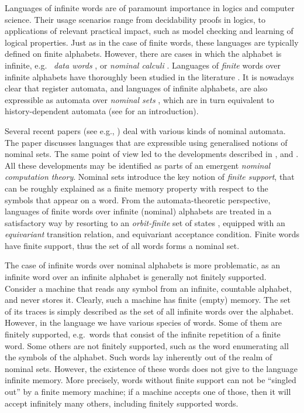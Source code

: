 

Languages of infinite words are of paramount importance in logics and computer science. Their usage scenarios range from decidability proofs in logics, 
 to applications of relevant practical impact, such as model checking and learning of logical properties. Just as in the case of finite words, these languages are typically defined on finite alphabets. However, there are cases in which the alphabet is infinite, e.g.\
\emph{data words} \cite{TODO}, or \emph{nominal calculi} \cite{Pi-calculus}. Languages of \emph{finite} words over infinite alphabets have thoroughly been studied in the literature \cite{KAMINKSIFRANCEZ,SEGOUFIN?,NIKOS}. 
It is nowadays clear that register automata, and languages of infinite alphabets, are also expressible as automata over \emph{nominal sets} \cite{GabbayPitts}, which are in turn equivalent  to history-dependent automata \cite{PISTORE,GADDUCCI,STATON,CIANCIA} (see \cite{CianciaTuostoTR} for an introduction). 
\todo{Si può citare qualcosa di Daniela?}

Several recent papers (see e.g., \cite{TOMOYUKI,GABBAYCIANCIA}) deal with various kinds of nominal automata. The paper \cite{MikLICS} discusses languages that are expressible using generalised notions of nominal sets. The same point of view led to the developments described in \cite{MikPOPL12}, and \cite{PittsPOPL13}. All these developments may be identified as parts of an emergent
\emph{nominal computation theory}. Nominal sets introduce the key notion of \emph{finite support}, that can be roughly explained as a finite memory property with respect to the symbols that appear on a word. From the automata-theoretic perspective, languages of finite words over infinite (nominal) alphabets are treated in a satisfactory way by resorting to an \emph{orbit-finite} set of states \cite{CianciaMontanariIC?}, equipped with an \emph{equivariant} transition relation, and equivariant acceptance condition. Finite words have finite support, thus the set of all words forms a nominal set. 

The case of infinite words over nominal alphabets is more problematic, as an infinite word over an infinite alphabet is generally not finitely supported. Consider a machine that reads any symbol from an infinite, countable alphabet, and never stores it. Clearly, such a machine has finite (empty) memory. The set of its traces is simply described as the set of all infinite words over the alphabet. However, in the language we have various species of words. Some of them are finitely supported, e.g.\ words that consist of the infinite repetition of a finite word. Some others are not finitely supported, such as the word enumerating all the symbols of the alphabet. Such words lay inherently out of the realm of nominal sets. However, the existence of these words does not give to the language infinite memory. More precisely,  words without finite support can not be ``singled out'' by a finite memory machine; if a machine accepts one of those, then it will accept infinitely many others, including finitely supported words.  

